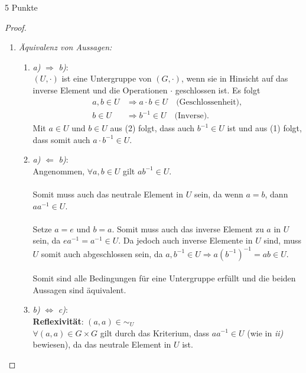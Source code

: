 \documentclass{problemset}
\begin{document}
\begin{problem}{5 Punkte}
\begin{proof}
    \begin{enumerate}
        \item \textit{Äquivalenz von Aussagen:}
              \begin{enumerate}[label=\alph*)]
                  \item \textit{a)} $\Longrightarrow$ \textit{b)}: \\
                        $(U, \cdot)$ ist eine Untergruppe von $(G, \cdot)$, wenn sie in Hinsicht auf das inverse Element und die Operationen $\cdot$ geschlossen ist.
                        Es folgt
                        \begin{align}
                            a, b \in U & \Longrightarrow a \cdot b \in U \quad \text{(Geschlossenheit)}, \\
                            b \in U    & \Longrightarrow b^{-1} \in U \quad \text{(Inverse)}.
                        \end{align}
                        Mit $a \in U$ und $b \in U$ aus (2) folgt, dass auch $b^{-1} \in U$ ist und aus (1) folgt, dass somit auch $a \cdot b^{-1} \in U$. \checkmark
                  \item \textit{a)} $\Longleftarrow$ \textit{b)}: \\
                        Angenommen, $\forall a,b \in U$ gilt $ab^{-1} \in U$. \\
                        \\
                        Somit muss auch das neutrale Element in $U$ sein, da wenn $a=b$, dann $aa^{-1} \in U$. \\
                        \\
                        Setze $a=e$ und $b=a$. Somit muss auch das inverse Element zu $a$ in $U$ sein, da $ea^{-1} = a^{-1} \in U$.
                        Da jedoch auch inverse Elemente in $U$ sind, muss $U$ somit auch abgeschlossen sein, da $a,b^{-1} \in U \Longrightarrow a{(b^{-1})}^{-1} = ab \in U$. \\
                        \\
                        Somit sind alle Bedingungen für eine Untergruppe erfüllt und die beiden Aussagen sind äquivalent. \checkmark
                  \item \textit{b)} $\Longleftrightarrow$ \textit{c)}: \\
                        \textbf{Reflexivität}: $(a, a) \in \sim_U$ \\
                        $\forall (a,a) \in G \times G$ gilt durch das Kriterium, dass $aa^{-1} \in U$ (wie in \textit{ii)} bewiesen), da das neutrale Element in $U$ ist. \checkmark \\

\end{enumerate}
\end{enumerate}
\end{proof}
\end{problem}
\end{document}
